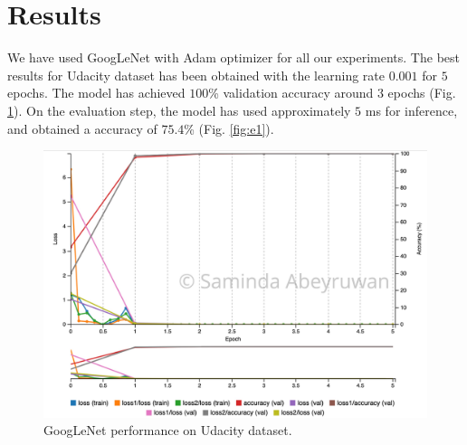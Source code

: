 \documentclass[10pt,journal,compsoc]{IEEEtran}
\begin{document}

\section{Results}

We have used GoogLeNet with Adam optimizer for all our experiments. The best results for Udacity dataset has been obtained with the learning rate $0.001$ for $5$ epochs. The model has achieved $100$\% validation accuracy around $3$ epochs (Fig. \ref{fig:m1}). On the evaluation step, the model has used approximately $5$ ms for inference, and obtained a accuracy of $75.4$\% (Fig. \ref{fig:e1}). 

\begin{figure}[thpb]
      \centering
      \includegraphics[width=\linewidth]{M1}
      \caption{GoogLeNet performance on Udacity dataset.}
      \label{fig:m1}
\end{figure}
\end{document}

